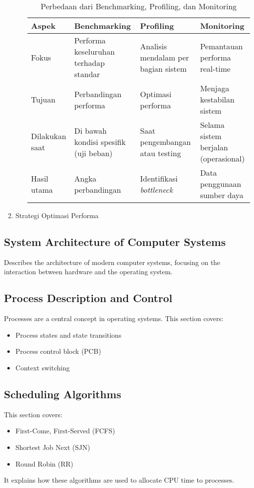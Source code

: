 \documentclass[12pt]{article}
\begin{document}
\begin{enumerate}
\begin{enumerate}
\begin{table}[htbp]
\begin{tabular}{|p{2cm}|p{3cm}|p{3cm}|p{3cm}|}
        \hline
        Aspek & Benchmarking & Profiling & Monitoring \\
        \hline
        Fokus & Performa keseluruhan terhadap standar & Analisis mendalam per bagian sistem & Pemantauan performa real-time \\
        \hline
        Tujuan & Perbandingan performa & Optimasi performa & Menjaga kestabilan sistem \\
        \hline
        Dilakukan saat & Di bawah kondisi spesifik (uji beban) & Saat pengembangan atau testing & Selama sistem berjalan (operasional) \\
        \hline
        Hasil utama & Angka perbandingan & Identifikasi \textit{bottleneck} & Data penggunaan sumber daya \\
        \hline
        \end{tabular}
        \caption{Perbedaan dari Benchmarking, Profiling, dan Monitoring}
        \label{table:ringkasan_perbedaan}
    \end{table}
    \end{enumerate}
    \item {Strategi Optimasi Performa}
    \par 
\end{enumerate}



\subsection{System Architecture of Computer Systems}
Describes the architecture of modern computer systems, focusing on the interaction between hardware and the operating system.

\subsection{Process Description and Control}
Processes are a central concept in operating systems. This section covers:
\begin{itemize}
    \item Process states and state transitions
    \item Process control block (PCB)
    \item Context switching
\end{itemize}

\subsection{Scheduling Algorithms}
This section covers:
\begin{itemize}
    \item First-Come, First-Served (FCFS)
    \item Shortest Job Next (SJN)
    \item Round Robin (RR)
\end{itemize}
It explains how these algorithms are used to allocate CPU time to processes.
\end{document}
